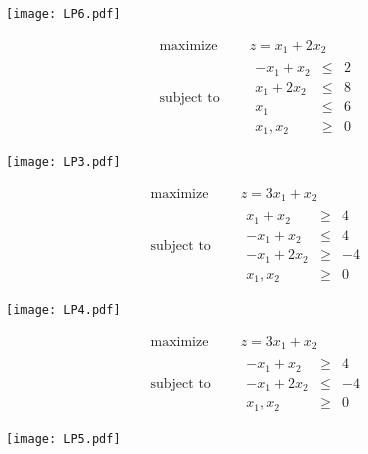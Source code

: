   \begin{center}
    \texttt{[image: LP6.pdf]}
  \end{center}


  \begin{Exercise}
    \begin{equation*}
      \begin{aligned}
        \text{maximize } \quad & z = x_1 + 2x_2 \\
        \text{subject to }\quad &
        \begin{array}{rcl}
          -x_1+x_2 & \leq & 2\\
          x_1 + 2x_2 &\leq& 8\\
          x_1 &\leq& 6\\
          x_1,x_2 &\geq &0
        \end{array}
      \end{aligned}
    \end{equation*}
  \end{Exercise}
  \begin{center}
   \texttt{[image: LP3.pdf]}
  \end{center}


  \begin{Exercise}
    \begin{equation*}
      \begin{aligned}
        \text{maximize } \quad & z = 3x_1 + x_2 \\
        \text{subject to }\quad &
        \begin{array}{rcl}
          x_1+x_2 & \geq & 4\\
          -x_1 + x_2 &\leq& 4\\
          -x_1 +2x_2 &\geq& -4\\
          x_1,x_2 &\geq &0
        \end{array}
      \end{aligned}
    \end{equation*}
  \end{Exercise}
  \begin{center}
   \texttt{[image: LP4.pdf]}
  \end{center}


  \begin{Exercise}
    \begin{equation*}
      \begin{aligned}
        \text{maximize } \quad & z = 3x_1 + x_2 \\
        \text{subject to }\quad &
        \begin{array}{rcl}
          -x_1 + x_2 &\geq& 4\\
          -x_1 +2x_2 &\leq& -4\\
          x_1,x_2 &\geq &0
        \end{array}
      \end{aligned}
    \end{equation*}
  \end{Exercise}
  \begin{center}
    \texttt{[image: LP5.pdf]}
  \end{center}



